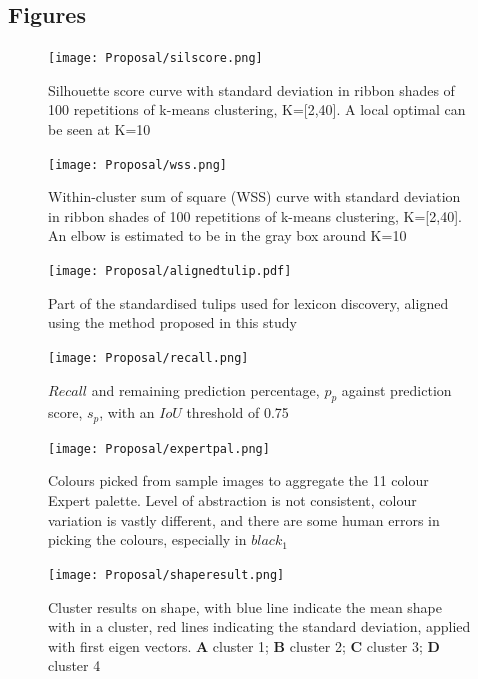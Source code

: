 \documentclass[11pt]{article}
\begin{document}
\subsection{Figures}
\begin{figure}[H]
\centering
\texttt{[image: Proposal/silscore.png]}
\caption{Silhouette score curve with standard deviation in ribbon shades of 100 repetitions of k-means clustering, K=[2,40]. A local optimal can be seen at K=10}
\label{fig: silscore}
\end{figure}


\begin{figure}[H]
\centering
\texttt{[image: Proposal/wss.png]}
\caption{Within-cluster sum of square (WSS) curve with standard deviation in ribbon shades of 100 repetitions of k-means clustering, K=[2,40]. An elbow is estimated to be in the gray box around K=10}
\label{fig: wss}
\end{figure}

\begin{figure}[H]
\centering
\texttt{[image: Proposal/alignedtulip.pdf]}
\caption{Part of the standardised tulips used for lexicon discovery, aligned using the method proposed in this study}
\label{fig:alignment}
\end{figure}

\begin{figure}[H]
\centering
\texttt{[image: Proposal/recall.png]}
\caption{$Recall$ and remaining prediction percentage, $p_{p}$ against prediction score, $s_{p}$, with an $IoU$ threshold of 0.75 }
\label{fig: recall}
\end{figure}

\begin{figure}[H]
\centering
\texttt{[image: Proposal/expertpal.png]}
\caption{Colours picked from sample images to aggregate the 11 colour Expert palette. Level of abstraction is not consistent, colour variation is vastly different, and there are some human errors in picking the colours, especially in $black_1$ }
\label{fig:expertpalproblem}
\end{figure}

\begin{figure}[H]
\centering
\texttt{[image: Proposal/shaperesult.png]}
\caption{Cluster results on shape, with blue line indicate the mean shape with in a cluster, red lines indicating the standard deviation, applied with first eigen vectors. \textbf{A} cluster 1; \textbf{B} cluster 2; \textbf{C} cluster 3;  \textbf{D} cluster 4}
\label{fig:clustershape}
\end{figure}
\end{document}
